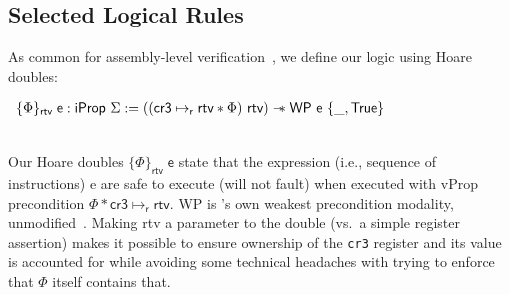 \subsection{Selected Logical Rules}
\label{sec:selected_rules}
As common for assembly-level verification~, we define our logic using Hoare doubles:%
\\\centerline{$
  \begin{array}{l}
    \{ \Phi \}_\mathsf{ rtv }\;\textsf{e} : \textsf{iProp }\Sigma := 
   ((\textsf{cr3} \mapsto_{\textsf{r}} \textsf{rtv} \ast \Phi) \textsf{ rtv}) \mathrel{-\!\!\ast} \textsf{WP e } \{\_, \textsf{True} \}
    \end{array}
$}\\
Our Hoare doubles $\{\Phi\}_\textsf{rtv}\;\textsf{e}$ state that the expression (i.e., sequence of instructions)
\textsf{e} are safe to execute (will not fault)
when executed with \textsf{vProp} precondition $\Phi\ast\textsf{cr3}\mapsto_{\textsf{r}} \textsf{rtv}$.
\textsf{WP} is \iris's own weakest precondition modality, unmodified~\cite{jung2018iris}.
Making \textsf{rtv} a parameter to the double (vs.\ a simple register assertion)
makes it possible to ensure ownership of the \lstinline|cr3| register and its value is accounted for
while avoiding some technical headaches with trying to enforce that $\Phi$ itself contains that.

